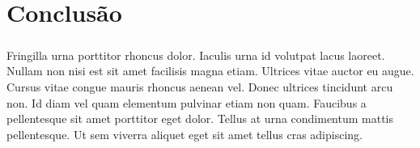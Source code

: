 \chapter{Conclusão}

\paragraph{}
Fringilla urna porttitor rhoncus dolor. Iaculis urna id volutpat lacus laoreet. Nullam non nisi est sit amet facilisis magna etiam. Ultrices vitae auctor eu augue. Cursus vitae congue mauris rhoncus aenean vel. Donec ultrices tincidunt arcu non. Id diam vel quam elementum pulvinar etiam non quam. Faucibus a pellentesque sit amet porttitor eget dolor. Tellus at urna condimentum mattis pellentesque. Ut sem viverra aliquet eget sit amet tellus cras adipiscing.